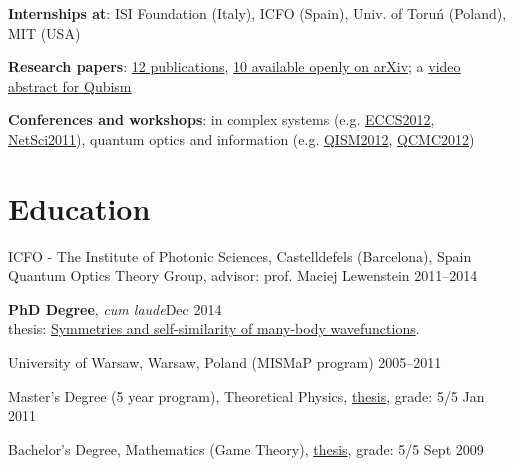 \documentclass[margin,line]{resume}
\begin{document}
\begin{resume}
\begin{list2}
    \item {\bf Internships at}: ISI Foundation (Italy), ICFO (Spain), Univ. of Toruń (Poland), MIT (USA)
    
    \item {\bf Research papers}: \href{http://scholar.google.com/citations?user=JUwBsPAAAAAJ&hl=en}{12 publications}, \href{http://arxiv.org/a/migdal\_p\_1}{10 available openly on arXiv};
    a \href{http://www.youtube.com/watch?v=8fPAzOziTZo}{video abstract for Qubism}

    \item {\bf Conferences and workshops}: in complex systems (e.g. \href{http://www.eccs2012.eu/}{ECCS2012}, \href{http://netsci2011.net/}{NetSci2011}), quantum optics and information (e.g. \href{http://www.uibk.ac.at/th-physik/qism2012/}{QISM2012}, \href{http://qcmc2012.org/}{QCMC2012})

    
    \end{list2}


    \section{\mysidestyle Education}
    
    ICFO - The Institute of Photonic Sciences,  Castelldefels (Barcelona), Spain \\%
    Quantum Optics Theory Group, advisor: prof. Maciej Lewenstein \hfill { 2011--2014}\\
   \begin{list2}
        \vspace*{-4mm}
        \item \textbf{PhD Degree}, \emph{cum laude}\hfill {Dec 2014}\\
            thesis: \href{http://arxiv.org/abs/1412.6796}{Symmetries and self-similarity of many-body wavefunctions}. 
    \end{list2}
    \vspace*{-4mm}
    University of Warsaw, Warsaw, Poland (MISMaP program) \hfill { 2005--2011}\\
    \begin{list2}
      \vspace*{-4mm}
      \item Master's Degree (5 year program),
      Theoretical Physics,
      \href{http://migdal.wikidot.com/en:collective-decoherence}{thesis}, grade: 5/5 \hfill { Jan 2011}
      \item Bachelor's Degree, Mathematics (Game Theory),
      \href{http://migdal.wikidot.com/en:mafia}{thesis}, grade: 5/5 \hfill { Sept 2009}
    \end{list2}




\end{resume}
\end{document}
